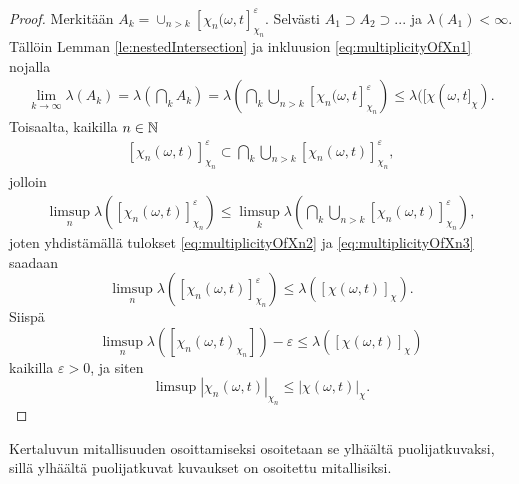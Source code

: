 \documentclass[12pt,oneside,a4paper]{amsbook} %
\begin{document}
\begin{proof}
        
    Merkitään $A_k = \cup_{n > k}[\chi_n(\omega, t]_{\chi_n}^\varepsilon$. Selvästi $A_1 \supset A_2 \supset ...$ ja $\lambda(A_1) < \infty$. Tällöin Lemman \ref{le:nestedIntersection} ja inkluusion \eqref{eq:multiplicityOfXn1} nojalla
    \begin{align*}
        \lim_{k\to \infty} \lambda(A_k) = \lambda\left(\bigcap_k A_k\right) = \lambda\left(\bigcap_k \bigcup_{n > k}[\chi_n(\omega, t]_{\chi_n}^\varepsilon\right) \le \lambda([\chi(\omega, t]_\chi).
    \end{align*}
    Toisaalta, kaikilla $n \in \mathbb{N}$
    \begin{align}\label{eq:multiplicityOfXn2}
        [\chi_n(\omega, t)]_{\chi_n}^\varepsilon \subset \bigcap_k \bigcup_{n > k} [\chi_n(\omega, t)]_{\chi_n}^\varepsilon,
    \end{align}
    jolloin
    \begin{align}\label{eq:multiplicityOfXn3}
        \limsup_n \lambda\left([\chi_n(\omega, t)]_{\chi_n}^\varepsilon\right) \le \limsup_k \lambda\left(\bigcap_k \bigcup_{n > k} [\chi_n(\omega, t)]_{\chi_n}^\varepsilon\right),
    \end{align}
    joten yhdistämällä tulokset \eqref{eq:multiplicityOfXn2} ja \eqref{eq:multiplicityOfXn3} saadaan
    \begin{equation*}
        \limsup_n \lambda([\chi_n(\omega, t)]_{\chi_n}^\varepsilon) \le \lambda([\chi(\omega, t)]_\chi).
    \end{equation*}
    Siispä
    \begin{equation*}
        \limsup_n \lambda([\chi_n(\omega, t)_{\chi_n}]) - \varepsilon \le \lambda([\chi(\omega, t)]_\chi)
    \end{equation*}
    kaikilla $\varepsilon > 0$, ja siten
    \begin{equation*}
        \limsup |\chi_n(\omega, t)|_{\chi_n} \le |\chi(\omega, t)|_\chi.
    \end{equation*}
\end{proof}

Kertaluvun mitallisuuden osoittamiseksi osoitetaan se ylhäältä puolijatkuvaksi, sillä ylhäältä puolijatkuvat kuvaukset on osoitettu mitallisiksi.
\end{document}
